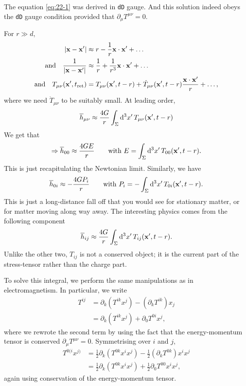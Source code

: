 The equation \eqref{eq:22-1} was derived in \texttt{dD} gauge. And this solution indeed obeys the \texttt{dD} gauge condition provided that $\partial_{\mu} T^{\mu\nu} = 0$.

For $r \gg d$, 
\begin{align}
  \abs{\vb{x} - \vb{x}'} &\approx r - \frac{1}{r} \vb{x} \cdot \vb{x}' + \dots \\
  \text{and} \quad \frac{1}{\abs{\vb{x} - \vb{x}'}} &\approx \frac{1}{r} + \frac{1}{r^3} \vb{x} \cdot \vb{x}' + \dots \\
  \text{and} \quad T_{\mu\nu} ( \vb{x}', t_{\text{ret}}) &= T_{\mu\nu} (\vb{x}', t - r) + \dot{T}_{\mu\nu} ( \vb{x}' , t - r) \frac{\vb{x} \cdot \vb{x}'}{r} + \dots,
\end{align} 
where we need $\dot{T}_{\mu\nu}$  to be suitably small.
At leading order, 
\begin{equation}
  \overline{h}_{\mu\nu} \approx \frac{4 G}{r} \int_{\Sigma} \dd[3]{x'} T_{\mu\nu}(\vb{x}', t - r)
\end{equation}
We get that
\begin{equation}
  \Rightarrow \overline{h}_{00} \approx \frac{4GE}{r} \qquad \text{with } E = \int_{\Sigma} \dd[3]{x'} T_{00} (\vb{x}', t - r).
\end{equation}
This is just recapitulating the Newtonian limit.
Similarly, we have
\begin{equation}
  \overline{h}_{0i} \approx - \frac{4GP_i}{r} \qquad \text{with } P_i = -\int_{\Sigma} \dd[3]{x'} T_{0i} (\vb{x}', t - r).
\end{equation}
This is just a long-distance fall off that you would see for stationary matter, or for matter moving along way away. 
The interesting physics comes from the following component
\begin{equation}
  \overline{h}_{ij} \approx \frac{4G}{r} \int_{\Sigma} \dd[3]{x'} T_{ij}(\vb{x}', t - r).
\end{equation}
Unlike the other two, $T_{ij}$  is not a conserved object; it is the current part of the stress-tensor rather than the charge part.

To solve this integral, we perform the same manipulations as in electromagnetism. In particular, we write
\begin{align}
  T^{ij} &= \partial_{k} (T^{ik} x^{j}) - (\partial_{k} T^{ik})x_{j} \\
	 &= \partial_{k} (T^{ik} x^{j}) + \partial_0 T^{0i} x^{j},
\end{align}
where we rewrote the second term by using the fact that the energy-momentum tensor is conserved $\partial_{\mu} T^{\mu\nu} = 0$.
Symmetrising over $i$  and $j$, 
\begin{align}
  T^{0(i} x^{j)} &= \frac{1}{2}\partial_{k} ( T^{0k} x^{i} x^{j}) - \frac{1}{2} (\partial_{k} T^{0k}) x^{i} x^{j} \\
  &= \frac{1}{2}\partial_{k} (T^{0k} x^{i} x^{j}) + \frac{1}{2} \partial_0 T^{00} x^{i} x^{j},
\end{align}
again using conservation of the energy-momentum tensor.

